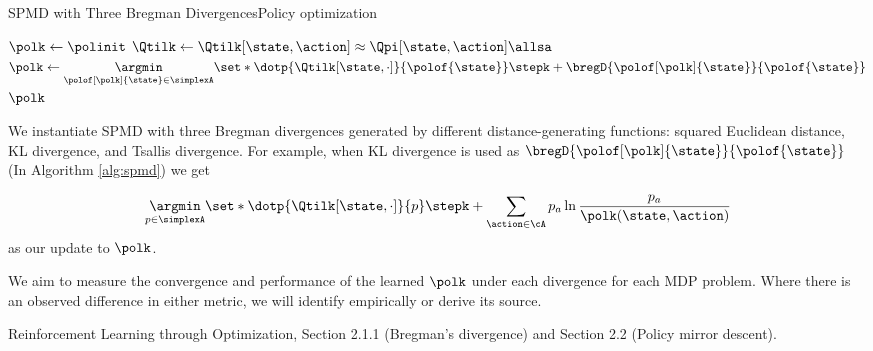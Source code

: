 \documentclass[11pt]{article}
\begin{document}
\begin{enhancement}{SPMD with Three Bregman Divergences}{Policy optimization}
\begin{algorithm}
\caption{Stochastic Policy Mirror Descent}
\label{alg:spmd}
\begin{algorithmic}[1]
\State $\polk \gets \polinit$
    \State $\Qtilk \gets \Qtilk[\state,\action] \approx \Qpi[\state,\action] \allsa$
    \State $\polk \gets \underset{\polof[\polk]{\state} \in \simplexA}{\argmin}
      \set*{ \dotp{\Qtilk[\state,\cdot]}{\polof{\state}} \stepk
             + \bregD{\polof[\polk]{\state}}{\polof{\state}} }$
\EndFor
\Return $\polk$
\EndProcedure
\end{algorithmic}
\end{algorithm}


We instantiate SPMD with three Bregman divergences generated by different
distance-generating functions: squared Euclidean distance, KL divergence, and Tsallis divergence.
For example, when KL divergence is used as $\bregD{\polof[\polk]{\state}}{\polof{\state}}$ (In Algorithm \ref{alg:spmd}) we get

\[
    \underset{p \in \simplexA}{\argmin}
      \set*{ \dotp{\Qtilk[\state,\cdot]}{p} \stepk
             + \sum_{\action \in \cA} p_a \ln \frac{p_a}{\polk (\state,\action)} }
\]             
as our update to $\polk$. 


 We aim to measure the convergence and performance of the learned $\polk$ under each divergence for each MDP problem.  Where there is an observed difference in either metric, we will identify empirically or derive its source.  



Reinforcement Learning through Optimization, Section 2.1.1 (Bregman's divergence) and Section 2.2 (Policy
mirror descent). 



\end{enhancement}
\end{document}
